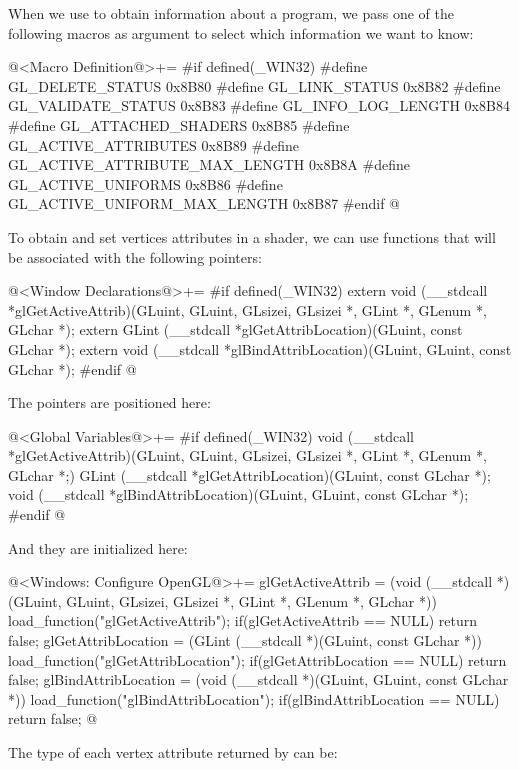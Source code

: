 When we use  to obtain information about a
program, we pass one of the following macros as argument to select
which information we want to know:

\iniciocodigo
@<Macro Definition@>+=
#if defined(_WIN32)
#define GL_DELETE_STATUS               0x8B80
#define GL_LINK_STATUS                 0x8B82
#define GL_VALIDATE_STATUS             0x8B83
#define GL_INFO_LOG_LENGTH             0x8B84
#define GL_ATTACHED_SHADERS            0x8B85
#define GL_ACTIVE_ATTRIBUTES           0x8B89
#define GL_ACTIVE_ATTRIBUTE_MAX_LENGTH 0x8B8A
#define GL_ACTIVE_UNIFORMS             0x8B86
#define GL_ACTIVE_UNIFORM_MAX_LENGTH   0x8B87
#endif
@
\fimcodigo

To obtain and set vertices attributes in a shader, we can use
functions that will be associated with the following pointers:

\iniciocodigo
@<Window Declarations@>+=
#if defined(_WIN32)
extern void (__stdcall *glGetActiveAttrib)(GLuint, GLuint, GLsizei, GLsizei *,
                                           GLint *, GLenum *, GLchar *);
extern GLint (__stdcall *glGetAttribLocation)(GLuint, const GLchar *);
extern void (__stdcall *glBindAttribLocation)(GLuint, GLuint, const GLchar *);
#endif
@
\fimcodigo

The pointers are positioned here:

\iniciocodigo
@<Global Variables@>+=
#if defined(_WIN32)
void (__stdcall *glGetActiveAttrib)(GLuint, GLuint, GLsizei, GLsizei *, GLint *,
                                    GLenum *, GLchar *;)
GLint (__stdcall *glGetAttribLocation)(GLuint, const GLchar *);
void (__stdcall *glBindAttribLocation)(GLuint, GLuint, const GLchar *);
#endif
@
\fimcodigo

And they are initialized here:

\iniciocodigo
@<Windows: Configure OpenGL@>+=
glGetActiveAttrib = (void (__stdcall *)(GLuint, GLuint, GLsizei, GLsizei *,
                                        GLint *, GLenum *, GLchar *))
                    load_function("glGetActiveAttrib");
if(glGetActiveAttrib == NULL) return false;
glGetAttribLocation = (GLint (__stdcall *)(GLuint, const GLchar *))
                           load_function("glGetAttribLocation");
if(glGetAttribLocation == NULL) return false;
glBindAttribLocation = (void (__stdcall *)(GLuint, GLuint, const GLchar *))
                              load_function("glBindAttribLocation");
if(glBindAttribLocation == NULL) return false;
@
\fimcodigo

The type of each vertex attribute returned
by  can be:

